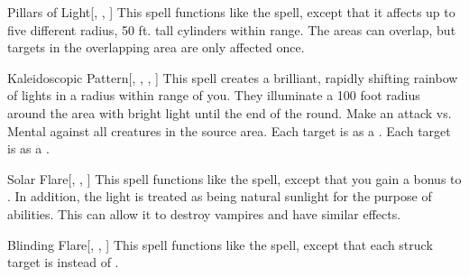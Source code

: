 \lowercase{\hypertarget{spell:Pillars of Light}{}}\label{spell:Pillars of Light}
\begin{freeability}[\nth{3}]{\hypertarget{spell:Pillars of Light}{Pillars of Light}}[, , ]
This spell functions like the  spell, except that it affects up to five different \areasmall radius, 50 ft. tall cylinders within range.
The areas can overlap, but targets in the overlapping area are only affected once.
\end{freeability}
\vspace{0.25em}



\lowercase{\hypertarget{spell:Kaleidoscopic Pattern}{}}\label{spell:Kaleidoscopic Pattern}
\begin{freeability}[\nth{4}]{\hypertarget{spell:Kaleidoscopic Pattern}{Kaleidoscopic Pattern}}[, , , ]
This spell creates a brilliant, rapidly shifting rainbow of lights in a \areasmall radius within \rngmed range of you.
They illuminate a 100 foot radius around the area with bright light until the end of the round.
Make an attack vs. Mental against all creatures in the source area.
\hit Each target is \dazed as a .
\crit Each target is \disoriented as a .
\end{freeability}
\vspace{0.25em}



\lowercase{\hypertarget{spell:Solar Flare}{}}\label{spell:Solar Flare}
\begin{freeability}[\nth{4}]{\hypertarget{spell:Solar Flare}{Solar Flare}}[, , ]
This spell functions like the  spell, except that you gain a  bonus to .
In addition, the light is treated as being natural sunlight for the purpose of abilities.
This can allow it to destroy vampires and have similar effects.
\end{freeability}
\vspace{0.25em}



\lowercase{\hypertarget{spell:Blinding Flare}{}}\label{spell:Blinding Flare}
\begin{freeability}[\nth{6}]{\hypertarget{spell:Blinding Flare}{Blinding Flare}}[, , ]
This spell functions like the  spell, except that each struck target is  instead of .
\end{freeability}
\vspace{0.25em}



